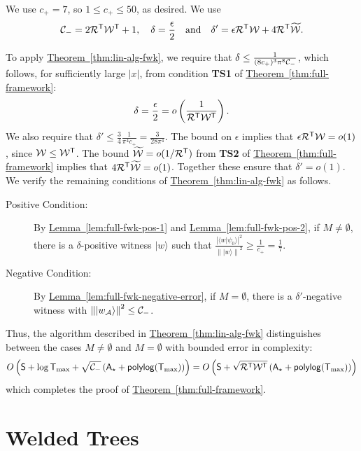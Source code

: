 \documentclass{article}
\newcommand{\thm}[1]{\hyperref[thm:#1]{Theorem~\ref*{thm:#1}}}
\newcommand{\lem}[1]{\hyperref[lem:#1]{Lemma~\ref*{lem:#1}}}
\def\ket#1{{\lvert}#1\rangle}
\renewcommand{\>}{\rangle}
\newcommand{\<}{\langle}
\renewcommand{\(}{\left(}
\renewcommand{\)}{\right)}
\def\braket#1#2{{{\langle}#1\vert}#2\rangle}
\def\norm#1{\left\| #1 \right\|}
\begin{document}
We use $c_+=7$, so $1\leq c_+\leq 50$, as desired. We use  
\begin{equation*}
{\cal C}_-=2{\cal R}^{\sf T}{\cal W}^{\sf T}+1,
\quad
\delta = \frac{\epsilon}{2}
\quad\mbox{and}\quad
\delta' = \epsilon {\cal R}^{\sf T}{\cal W}+4{\cal R}^{\sf T}\widetilde{\cal W}.
\end{equation*}

To apply \thm{lin-alg-fwk}, we require that $\delta\leq \frac{1}{(8c_+)^{3}\pi^8{{\cal C}_-}}$, which follows, for sufficiently large $|x|$, from condition \textbf{TS1} of \thm{full-framework}:
\begin{align*}
\delta = \frac{\epsilon}{2}=o\left(\frac{1}{{\cal R}^{\sf T}{\cal W}^{\sf T}}\right).
\end{align*}
We also require that $\delta'\leq \frac{3}{4}\frac{1}{\pi^4c_+}=\frac{3}{28\pi^4}$. The bound on $\epsilon$ implies that $\epsilon {\cal R}^{\sf T}{\cal W} = o(1)$, since ${\cal W}\leq {\cal W}^{\sf T}$. The bound $\widetilde{\cal W}=o(1/{\cal R}^{\sf T})$ from \textbf{TS2} of \thm{full-framework} implies that $4{\cal R}^{\sf T}\widetilde{\cal W}=o(1)$. 
Together these ensure that $\delta'=o(1)$.  
We verify the remaining conditions of \thm{lin-alg-fwk} as follows.
\begin{description}
\item[Positive Condition:] By \lem{full-fwk-pos-1} and \lem{full-fwk-pos-2}, if $M\neq \emptyset$, there is a $\delta$-positive witness $\ket{w}$ such that $\frac{|\braket{w}{\psi_0}|^2}{\norm{\ket{w}}^2}\geq \frac{1}{c_+}=\frac{1}{7}$. 
\item[Negative Condition:] By \lem{full-fwk-negative-error}, if $M=\emptyset$, there is a $\delta'$-negative witness with $\norm{\ket{w_{\cal A}}}^2\leq {\cal C}_-$. 
\end{description}

\noindent Thus, the algorithm described in \thm{lin-alg-fwk} distinguishes between the cases $M\neq \emptyset$ and $M=\emptyset$ with bounded error in complexity:
$$O\left({\sf S}+\log{\sf T}_{\max}+\sqrt{{\cal C}_-}\left({\sf A}_\star+{\sf polylog}({\sf T}_{\max})\right)\right)=O\left({\sf S}+\sqrt{{\cal R}^{\sf T}{\cal W}^{\sf T}}\left({\sf A}_\star+{\sf polylog}({\sf T}_{\max})\right)\right)$$
which completes the proof of \thm{full-framework}.




\section{Welded Trees}\label{sec:welded}
\end{document}
